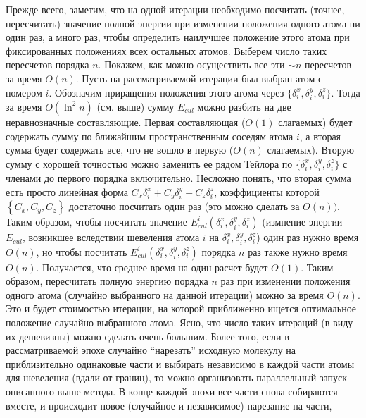   Прежде всего, заметим, что на одной итерации необходимо посчитать (точнее, 
  пересчитать) значение полной энергии при изменении положения одного атома ни 
  один раз, а много раз, чтобы определить наилучшее положение этого атома при 
  фиксированных положениях всех остальных атомов. Выберем число таких 
  пересчетов порядка $n$. Покажем, как можно осуществить все эти $\sim n$ 
  пересчетов за время ${O}\left( n \right)$. Пусть на рассматриваемой 
  итерации был выбран атом с номером $i$. Обозначим приращения положения этого 
  атома через $\{\delta _i^x ,\delta _i^y ,\delta _i^z \}$. Тогда за время 
  ${O}\left( {\ln ^2n} \right)$ (см. выше) сумму $E_{cul}$ можно разбить на две 
  неравнозначные составляющие. Первая составляющая (${O}\left( 1 \right)$ 
  слагаемых) будет содержать сумму по ближайшим пространственным соседям атома 
  $i$, а вторая сумма будет содержать все, что не вошло в первую (${
  O}\left( n \right)$ слагаемых). Вторую сумму с хорошей точностью можно 
  заменить ее рядом Тейлора по $\{\delta _i^x ,\delta _i^y ,\delta _i^z \}$ с 
  членами до первого порядка включительно. 
  Несложно понять, что вторая сумма есть просто линейная форма 
  $C_x \delta _i^x + C_y \delta _i^y +C_z \delta _i^z $, коэффициенты которой 
  $\left\{ {C_x ,C_y ,C_z } \right\}$ достаточно посчитать один раз (это можно 
  сделать за ${O}\left( n \right))$. Таким образом, чтобы посчитать 
  значение $E_{cul}^i \left( {\delta _i^x ,\delta _i^y ,\delta _i^z } 
  \right)$ (измнение энергии $E_{cul}$, возникшее вследствии шевеления атома $i$ на ${\delta _i^x ,\delta _i^y ,\delta _i^z }$) один раз нужно время ${O}\left( n \right)$, но чтобы посчитать 
  $E_{cul}^i \left( {\delta _i^x ,\delta _i^y ,\delta _i^z } \right)$ порядка 
  $n$ раз также нужно время ${O}\left( n \right)$. Получается, что среднее 
  время на один расчет будет ${O}\left( 1 \right)$. Таким образом, 
  пересчитать полную энергию порядка $n$ раз при изменении положения одного 
  атома (случайно выбранного на данной итерации) можно за время ${O}\left( 
  n \right)$. Это и будет стоимостью итерации, на которой приближенно ищется 
  оптимальное положение случайно выбранного атома. Ясно, что число таких 
  итераций (в виду их дешевизны) можно сделать очень большим. Более того, если 
  в рассматриваемой эпохе случайно ``нарезать'' исходную молекулу на 
  приблизительно одинаковые части и выбирать независимо в каждой части атомы 
  для шевеления (вдали от границ), то можно организовать параллельный запуск 
  описанного выше метода. В конце каждой эпохи все части снова собираются 
  вместе, и происходит новое (случайное и независимое) нарезание на части, 

